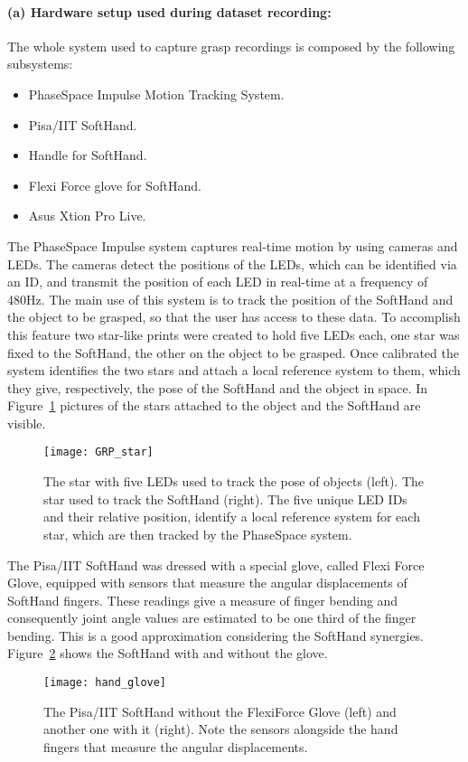\paragraph{(a) Hardware setup used during dataset recording:}
The whole system used to capture grasp recordings is composed by the following subsystems:
\begin{itemize}
  \item PhaseSpace Impulse Motion Tracking System.
  \item Pisa/IIT SoftHand.
  \item Handle for SoftHand.
  \item Flexi Force glove for SoftHand.
  \item Asus Xtion Pro Live.
\end{itemize}

The PhaseSpace Impulse system captures real-time motion by using cameras and LEDs.
The cameras detect the positions of the LEDs, which can be identified via an ID, and transmit the position of each LED in real-time at a frequency of 480Hz.
The main use of this system is to track the position of the SoftHand and the object to be grasped, so that the user has access to these data. 
To accomplish this feature two star-like prints were created to hold five LEDs each, one star was fixed to the SoftHand, the other on the object to be grasped.
Once calibrated the system identifies the two stars and attach a local reference system to them, which they give, respectively, the pose of the SoftHand and the object in space. %
In Figure~\ref{fig:grasp:star} pictures of the stars attached to the object and the SoftHand are visible.
\begin{figure}[b!]
  \centering
  \texttt{[image: GRP\_star]}
  \caption{The star with five LEDs used to track the pose of objects (left). The star used to track the SoftHand (right). The five unique LED IDs and their relative position, identify a local reference system for each star, which are then tracked by the PhaseSpace system.}
  \label{fig:grasp:star}
\end{figure}

The Pisa/IIT SoftHand was dressed with a special glove, called Flexi Force Glove, equipped with sensors that measure the angular displacements of SoftHand fingers.
These readings give a measure of finger bending and consequently joint angle values are estimated to be one third of the finger bending. This is a good approximation considering 
the SoftHand synergies. Figure~\ref{fig:grasp:hand_glove} shows the SoftHand with and without the glove.
\begin{figure}[tb!]
  \centering
  \texttt{[image: hand\_glove]}
  \caption{The Pisa/IIT SoftHand without the FlexiForce Glove (left) and another one with it (right). Note the sensors alongside the hand fingers that measure the angular displacements.}
  \label{fig:grasp:hand_glove}
\end{figure}

